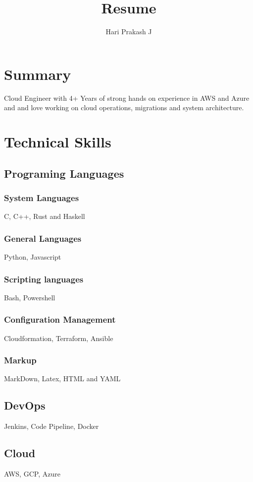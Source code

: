 \documentclass{article}
\begin{document}
    \title{Resume}
    \author{Hari Prakash J}
    \maketitle

    \section{Summary}
    Cloud Engineer with 4+ Years of strong hands on experience in AWS and Azure and and love working on cloud operations, migrations and system architecture.


    \section{Technical Skills}
    \subsection{Programing Languages}
    \subsubsection{System Languages}
    C, C++, Rust and Haskell
    \subsubsection{General Languages}
    Python, Javascript
    \subsubsection{ Scripting languages}
    Bash, Powershell
    \subsubsection{ Configuration Management}
    Cloudformation, Terraform, Ansible
    \subsubsection{ Markup}
    MarkDown, Latex, HTML and YAML
    \subsection{ DevOps}
     Jenkins, Code Pipeline, Docker
    \subsection{ Cloud}
     AWS,  GCP,  Azure
\end{document}

